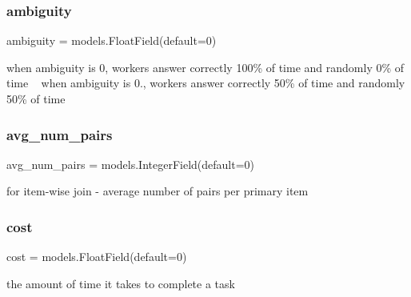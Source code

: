 \subsubsection{\texorpdfstring{ambiguity}{ambiguity}}
{\footnotesize\ttfamily ambiguity = models.\+Float\+Field(default=0)\hspace{0.3cm}{\ttfamily [static]}}



when ambiguity is 0, workers answer correctly 100\% of time and randomly 0\% of time ~\newline
 when ambiguity is 0., workers answer correctly 50\% of time and randomly 50\% of time 

\mbox{\label{classjoinapp_1_1models_1_1task__management__models_1_1_task_stats_abb284c412bd3c66808995bf072f99dbd}} 
\subsubsection{\texorpdfstring{avg\_num\_pairs}{avg\_num\_pairs}}
{\footnotesize\ttfamily avg\+\_\+num\+\_\+pairs = models.\+Integer\+Field(default=0)\hspace{0.3cm}{\ttfamily [static]}}



for item-\/wise join -\/ average number of pairs per primary item 

\mbox{\label{classjoinapp_1_1models_1_1task__management__models_1_1_task_stats_a6ce3360f2586a441b79b1053cfd2769c}} 
\subsubsection{\texorpdfstring{cost}{cost}}
{\footnotesize\ttfamily cost = models.\+Float\+Field(default=0)\hspace{0.3cm}{\ttfamily [static]}}



the amount of time it takes to complete a task 

\mbox{\label{classjoinapp_1_1models_1_1task__management__models_1_1_task_stats_a1886f706160a9658431d6e804129890a}} 
